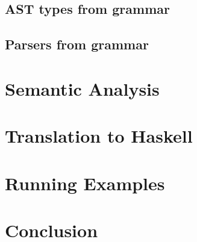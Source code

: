 \documentclass{article}
\def\H{Haskell}
\begin{document}
\subsection{AST types from grammar}

\subsection{Parsers from grammar}

\section{Semantic Analysis}

\section{Translation to \H}

\section{Running Examples}

\section{Conclusion}
\end{document}
